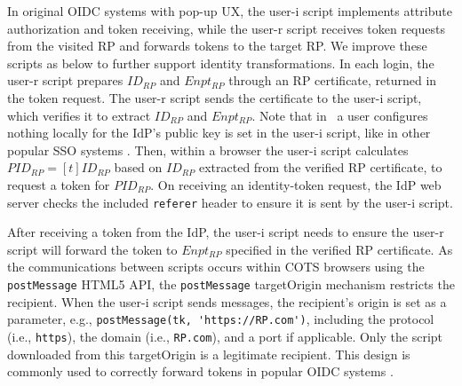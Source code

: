 In original OIDC systems with pop-up UX,
    the user-i script implements attribute authorization and token receiving,
        while the user-r script receives token requests from the visited RP and forwards tokens to the target RP.
We improve these scripts as below to further support identity transformations.
In each login, the user-r script prepares $ID_{RP}$ and $Enpt_{RP}$ %
 through an RP certificate, returned in the token request. %
The user-r script sends the certificate to the user-i script, which verifies it to extract $ID_{RP}$ and $Enpt_{RP}$.
Note that in \usso\ a user configures nothing locally for the IdP's public key is set in the user-i script, like in other popular SSO systems \cite{OpenIDConnect, rfc6749, SAML, SAMLIdentifier}.
Then, within a browser the user-i script calculates $PID_{RP} = [t]ID_{RP}$ based on $ID_{RP}$ extracted from the verified RP certificate, %
to request a token for $PID_{RP}$.
On receiving an identity-token request, the IdP web server checks the included \texttt{referer} header to ensure it is sent by the user-i script.


After receiving a token from the IdP, the user-i script needs to ensure the user-r script will forward the token to $Enpt_{RP}$ %
specified in the verified RP certificate.
As the communications between scripts occurs within COTS browsers using the \verb+postMessage+ HTML5 API, %
the \verb+postMessage+ targetOrigin mechanism \cite{postm-targeto} restricts the recipient. %
When the user-i script sends messages, the recipient's origin is set as a parameter, e.g., \verb+postMessage(tk, 'https://RP.com')+, including the protocol (i.e., \verb+https+), the domain (i.e., \verb+RP.com+), and a port if applicable.
Only the script downloaded from this targetOrigin is a legitimate recipient.
This design is commonly used to correctly forward tokens in popular OIDC systems \cite{SPRESSO,MITREid,BrowserID,de2014oauth,OpenIDConnect}.

